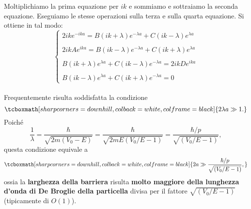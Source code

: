 Moltiplichiamo la prima equazione per $ik$ e sommiamo e sottraiamo la seconda equazione. Eseguiamo le stesse operazioni sulla terza e sulla quarta equazione. Si ottiene in tal modo:
	\begin{equation}
		\begin{cases}
		\displaystyle{2ike^{-ika}= B \left(ik+\lambda\right)e^{-\lambda a} +C \left(ik-\lambda\right)e^{\lambda a} }\\
		\\
		\displaystyle{2ikAe^{ika}= B \left(ik-\lambda\right)e^{-\lambda a} +C \left(ik+\lambda\right)e^{\lambda a} }\\
		\\
		\displaystyle{B\left(ik+\lambda\right)e^{\lambda a} + C\left(ik-\lambda\right)e^{-\lambda a} = 2ikD e^{ika}}\\
		\\
		\displaystyle{B\left(ik-\lambda\right)e^{\lambda a} + C\left(ik+\lambda\right)e^{-\lambda a} =0}
		\end{cases}
	\label{eq:cap10_10}
	\end{equation}\\

Frequentemente risulta soddisfatta la condizione
	\begin{equation}
		\tcboxmath[sharp corners=downhill, colback=white, colframe=black]{
			2\lambda a \gg 1.
			}
	\end{equation}
Poiché
	\begin{equation}
		\frac{1}{\lambda}=\frac{\hbar}{\sqrt{2m\left(V_0 - E \right)}}=\frac{\hbar}{\sqrt{2mE\left(V_0/E - 1 \right)}}=\frac{\hbar /p}{\sqrt{\left(V_0/E - 1 \right)}},
	\end{equation}
questa condizione equivale a
	\begin{equation}
		\tcboxmath[sharp corners=downhill, colback=white, colframe=black]{
			2a \gg \frac{\hbar /p}{\sqrt{\left(V_0/E - 1 \right)}},
			}
	\end{equation}
ossia la \textbf{larghezza della barriera} risulta \textbf{molto maggiore della lunghezza d'onda di De Broglie della particella} divisa per il fattore $\sqrt{\left(V_0/E - 1 \right)}$ (tipicamente di $O(1)$).\\

